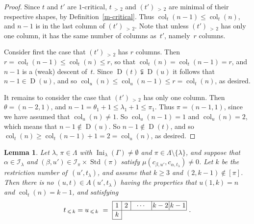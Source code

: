 \documentclass[10pt]{amsart}
\newtheorem{lemm}[theo]{Lemma}
\theoremstyle{definition}
\DeclareMathOperator{\Ini}{Ini}
\DeclareMathOperator{\col}{col}
\newcommand{\morethan}[2]{#1\,{_{>\,#2}}}
\newcommand{\Lessthan}[2]{#1\,{_{\leqslant\,#2}}}
\DeclareMathOperator{\STD}{Std}
\DeclareMathOperator{\D}{D}
\begin{document}
\begin{proof}
Since $t$ and $t'$ are $1$-critical, $\morethan t2$ and $\morethan{(t')}2$ are
minimal of their respective shapes, by Definition~\ref{m-critical}. Thus
$\col_t(n-1)\leqslant\col_t(n)$, and $n-1$ is in the last column of $\morethan{(t')}2$.
Note that unless $\morethan{(t')}2$ has only one column, it has the same number of
columns as~$t'$, namely~$r$ columns.

Consider first the case that $\morethan{(t')}2$ has $r$ columns. Then
$r=\col_t(n-1)\leqslant\col_t(n)\leqslant r$, so that $\col_t(n)=\col_t(n-1)=r$,
and $n-1$ is a (weak) descent of~$t$. Since $\D(t)\subsetneqq\D(u)$ it follows that
$n-1\in\D(u)$, and so $\col_u(n)\leqslant\col_u(n-1)\leqslant r=\col_t(n)$,
as desired.

It remains to consider the case that $\morethan{(t')}2$ has only one column.
Then $\theta=(n-2,1)$, and $n-1=\theta_1+1\leqslant\lambda_1+1\leqslant\pi_1$.
Thus $\pi=(n-1,1)$, since we have assumed that $\col_u(n)\ne 1$.
So $\col_u(n-1)=1$ and $\col_u(n)=2$, which means that $n-1\notin\D(u)$.
So $n-1\notin\D(t)$, and so $\col_t(n)\geqslant\col_t(n-1)+1=2=\col_u(n)$,
as desired.
\end{proof}

\begin{lemm}\label{k-minimalonerow}
Let $\lambda,\,\pi\in\Lambda$ with $\Ini_\lambda(\Gamma)\ne\emptyset$ and
$\pi\in\Lambda\setminus\{\lambda\}$, and suppose that $\alpha\in\mathcal I_\lambda$
and $(\beta,u')\in\mathcal I_\pi\times\STD(\pi)$ satisfy
$\mu(c_{\beta,u'},c_{\alpha,t_\lambda})\neq 0$.
Let $k$ be the restriction number of~$(u',t_\lambda)$, and assume that
$k\geqslant 3$ and $(2,k-1)\notin[\pi]$. Then there is no $(u,t)\in A(u',t_\lambda)$
having the properties that $u(1,k)=n$ and $\col_t(n)=k-1$, and satisfying
\[
\Lessthan tk=\Lessthan uk\ =\ \vcenter{\offinterlineskip\small
\hbox{\vrule height 0.4 pt depth 0 pt width 108.4pt}
\hbox{\vrule height 9 pt depth 4 pt\hbox to 13pt{\hfil$1$\hfil}\vrule
\hbox to 13pt{\hfil$2$\hfil}\vrule\hbox to 30pt{\hfil$\cdots$\hfil}\vrule
\hbox to 25pt{\hfil$k-2$\hfil}\vrule
\hbox to 25pt{\hfil$k-1$\hfil}\vrule}
\hrule
\hbox{\vrule height 9 pt depth 4 pt\hbox to 13pt{\hfil$k$\hfil}\vrule}
\hrule width 14.2 pt}\ .
\]
\end{lemm}
\end{document}
